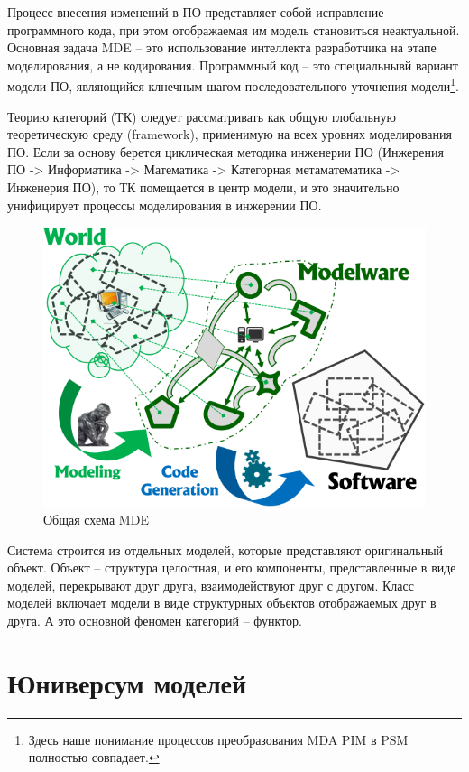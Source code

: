 \documentclass[12pt,a4paper]{ltxdoc}
\begin{document}
Процесс внесения изменений в ПО представляет собой исправление программного кода, при этом отображаемая им модель становиться неактуальной.  Основная задача MDE -- это использование интеллекта разработчика на этапе моделирования, а не кодирования. Программный код -- это специальнывй вариант модели ПО, являющийся клнечным шагом последовательного уточнения модели\footnote{Здесь наше понимание процессов преобразования MDA PIM в PSM полностью совпадает.}.

Теорию категорий (ТК) следует рассматривать как общую глобальную теоретическую среду (framework), применимую на всех уровнях моделирования ПО.  Если за основу берется циклическая методика инженерии ПО (Инжерения ПО -> Информатика -> Математика -> Категорная метаматематика -> Инженерия ПО), то ТК помещается в центр модели, и это значительно унифицирует процессы моделирования в инжерении ПО.

\begin{figure}[htbp]
  \centering
  \includegraphics[width=0.5\linewidth]{mde-general}
  \caption{Общая схема MDE}
  \label{fig:mde-gen-schema}
\end{figure}

Система строится из отдельных моделей, которые представляют оригинальный объект.  Объект -- структура целостная, и его компоненты, представленные в виде моделей, перекрывают друг друга, взаимодействуют друг с другом. Класс моделей включает модели в виде структурных объектов отображаемых друг в друга. А это основной феномен категорий -- функтор.

\section{Юниверсум моделей}
\label{sec:mmodcat}
\end{document}
